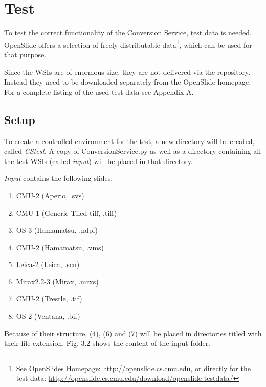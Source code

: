 \section{Test}

To test the correct functionality of the Conversion Service, test data is needed. OpenSlide offers a selection of freely distributable data\footnote{See OpenSlides Homepage: \url{http://openslide.cs.cmu.edu}, or directly for the test data: \url{http://openslide.cs.cmu.edu/download/openslide-testdata/}}, which can be used for that purpose.

Since the WSIs are of enormous size, they are not delivered via the repository. Instead they need to be downloaded separately from the OpenSlide homepage. For a complete listing of the used test data see Appendix A.


\subsection{Setup}

To create a controlled environment for the test, a new directory will be created, called \emph{CS{\textunderscore}test}. A copy of ConversionService.py as well as a directory containing all the test WSIs (called \emph{input}) will be placed in that directory.

\emph{Input} contains the following slides:

\begin{enumerate}[(1)]
	\item CMU-2 (Aperio, .svs)
	\item CMU-1 (Generic Tiled tiff, .tiff)
	\item OS-3 (Hamamatsu, .ndpi)
	\item CMU-2 (Hamamatsu, .vms)
	\item Leica-2 (Leica, .scn)
	\item Mirax2.2-3 (Mirax, .mrxs)
	\item CMU-2 (Trestle, .tif)
	\item OS-2 (Ventana, .bif)
\end{enumerate}

Because of their structure, (4), (6) and (7) will be placed in directories titled with their file extension. Fig. 3.2 shows the content of the input folder.

